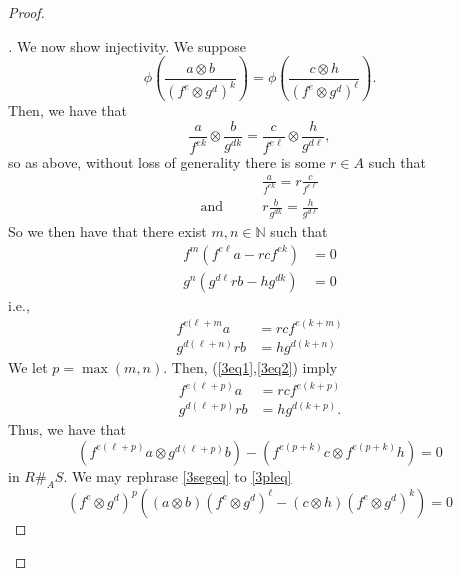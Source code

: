 \documentclass[english,letter,doublesided]{article}
\newcommand{\NN}{\mathbb{N}}
\newenvironment{subproof}[1][\proofname]{%
	\renewcommand{\qedsymbol}{$\blacksquare$}%
	\begin{proof}[#1]%
	}{%
	\end{proof}%
}
\theoremstyle{remark}
\theoremstyle{definition}
\begin{document}
\begin{proof}
\begin{subproof}
			We now show injectivity. We suppose $$\phi\left(\frac{a\otimes b}{(f^e\otimes g^d)^k}\right)=\phi\left(\frac{c\otimes h}{(f^e\otimes g^d)^\ell}\right).$$
			Then, we have that $$\frac{a}{f^{ek}}\otimes \frac{b}{g^{dk}}=\frac{c}{f^{e\ell}}\otimes \frac{h}{g^{d\ell}},$$ so as above, without loss of generality there is some $r\in A$ such that \begin{align*}
			&\frac{a}{f^{ek}}=r\frac{c}{f^{e\ell}}\\\text{and}\hspace{2em}&r\frac{b}{g^{dk}}=\frac{h}{g^{d\ell}}
			\end{align*}
			So we then have that there exist $m,n\in \NN$ such that \begin{align*}
			f^m(f^{e\ell}a-rcf^{ek})&=0\\
			g^n(g^{d\ell}rb-hg^{dk})&=0
			\end{align*}
			i.e.,
			\begin{align}
			\label{3eq1}f^{e(\ell+m}a&=rcf^{e(k+m)}\\
			\label{3eq2}g^{d(\ell+n)}rb&=hg^{d(k+n)}
			\end{align}
			We let $p=\max{(m,n)}$. Then, (\ref{3eq1},\ref{3eq2}) imply 
			\begin{align*}
			f^{e(\ell+p)}a&=rcf^{e(k+p)}\\
			g^{d(\ell+p)}rb&=hg^{d(k+p)}.
			\end{align*}
			Thus, we have that \begin{equation}\label{3segeq}\left(f^{e(\ell+p)}a\otimes g^{d(\ell+p)}b\right)-\left(f^{e(p+k)}c\otimes f^{e(p+k)}h \right)=0\end{equation} in $R\#_A S$. We may rephrase \eqref{3segeq} to \eqref{3pleq}
			\begin{equation}\label{3pleq}
			(f^e\otimes g^d)^p\left((a\otimes b)(f^e\otimes g^d)^\ell-(c\otimes h)(f^e\otimes g^d)^k\right)=0
			\end{equation}
			

\end{subproof}
\end{proof}
\end{document}
